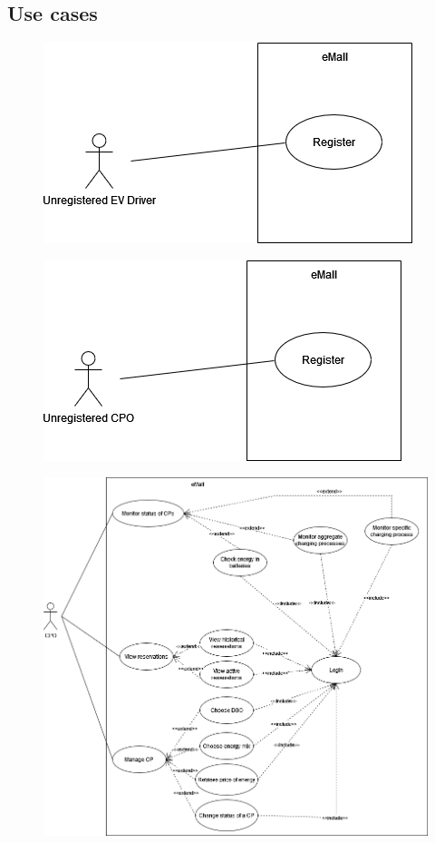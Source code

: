 \subsection{Use cases}

\begin{figure}[H]
    \centering
    \includegraphics[scale=0.6]{src/use_case_diagram/driver_registration.png}
\end{figure}

\begin{figure}[H]
    \centering
    \includegraphics[scale=0.6]{src/use_case_diagram/cpo_registration.png}
\end{figure}

\begin{figure}[H]
    \centering
    \includegraphics[scale=0.5]{src/use_case_diagram/cpo.png}
\end{figure}

